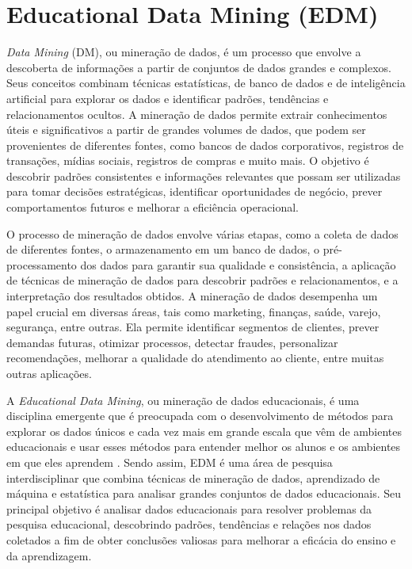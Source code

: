 



  
\section{Educational Data Mining (EDM)}

\textit{Data Mining} (DM), ou mineração de dados, é um processo que envolve a descoberta de informações a partir de conjuntos de dados grandes e complexos. Seus conceitos combinam técnicas estatísticas, de banco de dados e de inteligência artificial para explorar os dados e identificar padrões, tendências e relacionamentos ocultos. A mineração de dados permite extrair conhecimentos úteis e significativos a partir de grandes volumes de dados, que podem ser provenientes de diferentes fontes, como bancos de dados corporativos, registros de transações, mídias sociais, registros de compras e muito mais. O objetivo é descobrir padrões consistentes e informações relevantes que possam ser utilizadas para tomar decisões estratégicas, identificar oportunidades de negócio, prever comportamentos futuros e melhorar a eficiência operacional.

O processo de mineração de dados envolve várias etapas, como a coleta de dados de diferentes fontes, o armazenamento em um banco de dados, o pré-processamento dos dados para garantir sua qualidade e consistência, a aplicação de técnicas de mineração de dados para descobrir padrões e relacionamentos, e a interpretação dos resultados obtidos. A mineração de dados desempenha um papel crucial em diversas áreas, tais como marketing, finanças, saúde, varejo, segurança, entre outras. Ela permite identificar segmentos de clientes, prever demandas futuras, otimizar processos, detectar fraudes, personalizar recomendações, melhorar a qualidade do atendimento ao cliente, entre muitas outras aplicações.

A \textit{Educational Data Mining}, ou mineração de dados educacionais, é uma disciplina emergente que é preocupada com o desenvolvimento de métodos para explorar os dados únicos e cada vez mais em grande escala que vêm de ambientes educacionais e usar esses métodos para entender melhor os alunos e os ambientes em que eles aprendem \cite{Egitim:2017}. Sendo assim, EDM é uma área de pesquisa interdisciplinar que combina técnicas de mineração de dados, aprendizado de máquina e estatística para analisar grandes conjuntos de dados educacionais. Seu principal objetivo é analisar dados educacionais para resolver problemas da pesquisa educacional, descobrindo padrões, tendências e relações nos dados coletados a fim de obter conclusões valiosas para melhorar a eficácia do ensino e da aprendizagem.

